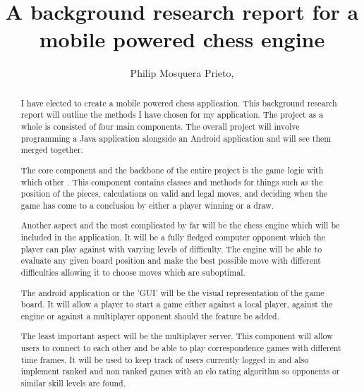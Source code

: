 \documentclass[11pt]{report}
\begin{document}
\title{A background research report for a mobile powered chess engine}
\author{Philip Mosquera Prieto,}
\maketitle

\renewcommand{\abstractname}{Introduction and Abstract}
\begin{abstract}

I have elected to create a mobile powered chess application. This background research report will outline the methods I have chosen for my application. The project as a whole is consisted of four main components. The overall project will involve programming a Java application alongside an Android application and will see them merged together. \newline

The core component and the backbone of the entire project is the game logic with which other . This component contains classes and methods for things such as the position of the pieces, calculations on valid and legal moves, and deciding when the game has come to a conclusion by either a player winning or a draw. \newline

Another aspect and the most complicated by far will be the chess engine which will be included in the application. It will be a fully fledged computer opponent which the player can play against with varying levels of difficulty. The engine will be able to evaluate any given board position and make the best possible move with different difficulties allowing it to choose moves which are suboptimal.\newline

The android application or the 'GUI' will be the visual representation of the game board. It will allow a player to start a game either against a local player, against the engine or against a multiplayer opponent should the feature be added.\newline

The least important aspect will be the multiplayer server. This component will allow users to connect to each other and be able to play correspondence games with different time frames. It will be used to keep track of users currently logged in and also implement ranked and non ranked games with an elo rating algorithm so opponents or similar skill levels are found. \newline

\end{abstract}
\end{document}
